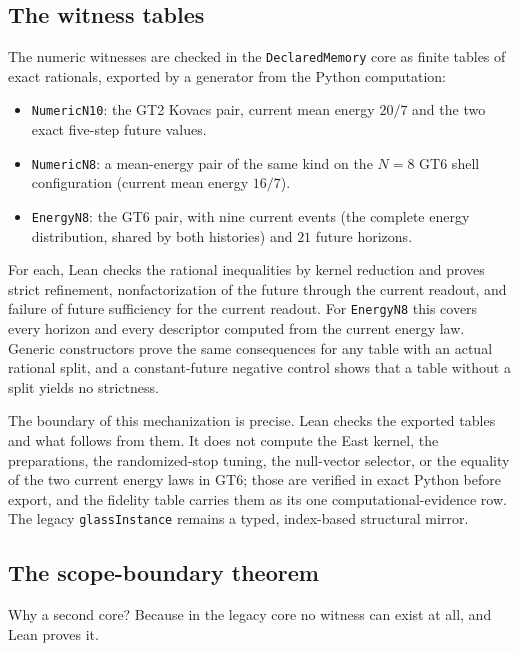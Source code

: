 \subsection{The witness tables}

The numeric witnesses are checked in the \texttt{DeclaredMemory} core as finite tables of exact
rationals, exported by a generator from the Python computation:

\begin{itemize}
  \item \texttt{NumericN10}: the GT2 Kovacs pair, current mean energy $20/7$ and the two exact
    five-step future values.
  \item \texttt{NumericN8}: a mean-energy pair of the same kind on the $N=8$ GT6 shell
    configuration (current mean energy $16/7$).
  \item \texttt{EnergyN8}: the GT6 pair, with nine current events (the complete energy
    distribution, shared by both histories) and $21$ future horizons.
\end{itemize}

For each, Lean checks the rational inequalities by kernel reduction and proves strict refinement,
nonfactorization of the future through the current readout, and failure of future sufficiency
for the current readout. For \texttt{EnergyN8} this covers every horizon and every descriptor
computed from the current energy law. Generic constructors prove the same consequences for any
table with an actual rational split, and a constant-future negative control shows that a table
without a split yields no strictness.

The boundary of this mechanization is precise. Lean checks the exported tables and what follows
from them. It does not compute the East kernel, the preparations, the randomized-stop tuning, the
null-vector selector, or the equality of the two current energy laws in GT6; those are verified in
exact Python before export, and the fidelity table carries them as its one
computational-evidence row. The legacy \texttt{glassInstance} remains a typed, index-based
structural mirror.

\subsection{The scope-boundary theorem}

Why a second core? Because in the legacy core no witness can exist at all, and Lean proves it.


